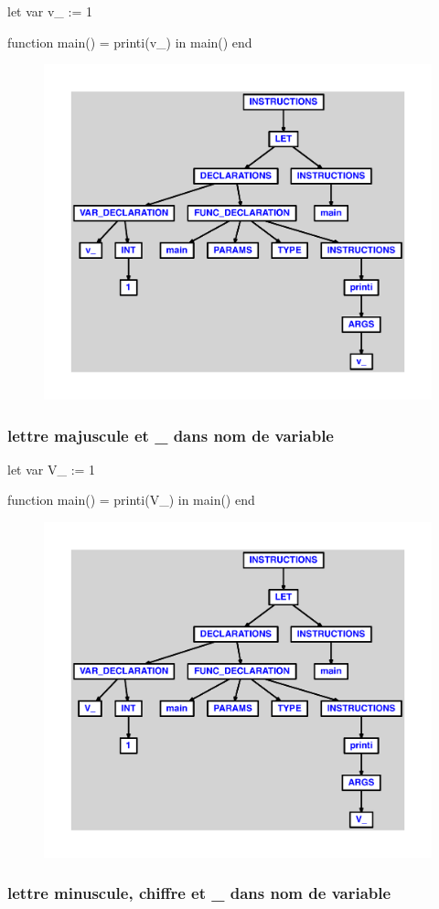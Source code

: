 \documentclass{article}
\begin{document}
\begin{verbatimtab}
let
	var v_ := 1

	function main() = printi(v_)
in main() end
\end{verbatimtab}
\begin{figure}[H]\centering\includegraphics[max width=\textwidth]{ast/ast_310.pdf}\end{figure}\subsubsection{lettre majuscule et \_ dans nom de variable}
\begin{verbatimtab}
let
	var V_ := 1

	function main() = printi(V_)
in main() end
\end{verbatimtab}
\begin{figure}[H]\centering\includegraphics[max width=\textwidth]{ast/ast_311.pdf}\end{figure}\subsubsection{lettre minuscule, chiffre et \_ dans nom de variable}
\end{document}
